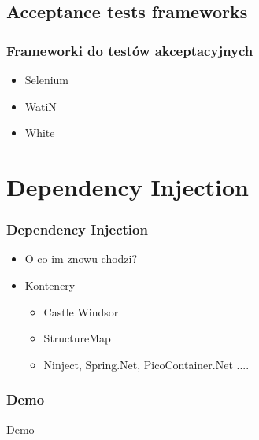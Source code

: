\documentclass[slidestop,compress,mathserif]{beamer}
\begin{document}
\subsection{Acceptance tests frameworks}
\begin{frame}
	\frametitle{Frameworki do testów akceptacyjnych}
	\begin{itemize}
		\item{Selenium}
		\pause \item{WatiN}
		\pause \item{White}
	\end{itemize}
\end{frame}

\section{Dependency Injection}
\begin{frame}
	\frametitle{Dependency Injection}
	\begin{itemize}
		\pause \item O co im znowu chodzi? %
		\pause \item Kontenery %
		\pause \begin{itemize}
			\item Castle Windsor
			\item StructureMap
			\item Ninject, Spring.Net, PicoContainer.Net ....
		\end{itemize}
	\end{itemize}
\end{frame}
	
	
\begin{frame}
	\frametitle{Demo}
	\begin{center}
		\huge{Demo}
	\end{center}
\end{frame}
	
	
\end{document}
